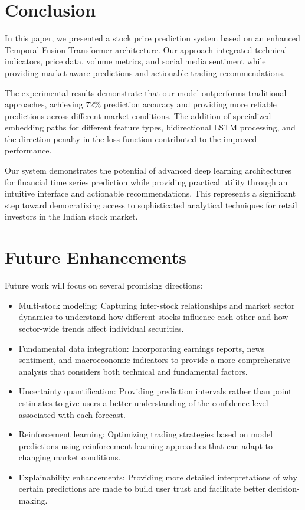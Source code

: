 \documentclass[conference]{IEEEtran}
\begin{document}
\section{Conclusion}
In this paper, we presented a stock price prediction system based on an enhanced Temporal Fusion Transformer architecture. Our approach integrated technical indicators, price data, volume metrics, and social media sentiment while providing market-aware predictions and actionable trading recommendations.

The experimental results demonstrate that our model outperforms traditional approaches, achieving 72\% prediction accuracy and providing more reliable predictions across different market conditions. The addition of specialized embedding paths for different feature types, bidirectional LSTM processing, and the direction penalty in the loss function contributed to the improved performance.

Our system demonstrates the potential of advanced deep learning architectures for financial time series prediction while providing practical utility through an intuitive interface and actionable recommendations. This represents a significant step toward democratizing access to sophisticated analytical techniques for retail investors in the Indian stock market.

\section{Future Enhancements}
Future work will focus on several promising directions:

\begin{itemize}
\item Multi-stock modeling: Capturing inter-stock relationships and market sector dynamics to understand how different stocks influence each other and how sector-wide trends affect individual securities.

\item Fundamental data integration: Incorporating earnings reports, news sentiment, and macroeconomic indicators to provide a more comprehensive analysis that considers both technical and fundamental factors.

\item Uncertainty quantification: Providing prediction intervals rather than point estimates to give users a better understanding of the confidence level associated with each forecast.

\item Reinforcement learning: Optimizing trading strategies based on model predictions using reinforcement learning approaches that can adapt to changing market conditions.

\item Explainability enhancements: Providing more detailed interpretations of why certain predictions are made to build user trust and facilitate better decision-making.
\end{itemize}
\end{document}
